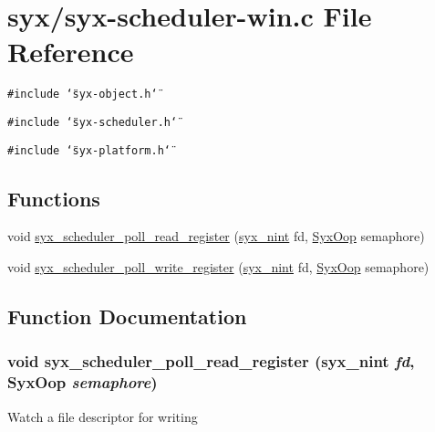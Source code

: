 \hypertarget{syx-scheduler-win_8c}{
\section{syx/syx-scheduler-win.c File Reference}
\label{syx-scheduler-win_8c}
}
{\tt \#include \char`\"{}syx-object.h\char`\"{}}\par
{\tt \#include \char`\"{}syx-scheduler.h\char`\"{}}\par
{\tt \#include \char`\"{}syx-platform.h\char`\"{}}\par
\subsection*{Functions}
\begin{CompactItemize}
\item 
void \hyperlink{syx-scheduler-win_8c_0f6beab52e1173b6a531ba23d437b2bf}{syx\_\-scheduler\_\-poll\_\-read\_\-register} (\hyperlink{syx-types_8h_488ad2504ade19c761a3e2a1726b4781}{syx\_\-nint} fd, \hyperlink{syx-types_8h_1121caba2d40b2ce090b640762744ccd}{SyxOop} semaphore)
\item 
void \hyperlink{syx-scheduler-win_8c_28eac1f77d3be9549426a9166ac5a9f3}{syx\_\-scheduler\_\-poll\_\-write\_\-register} (\hyperlink{syx-types_8h_488ad2504ade19c761a3e2a1726b4781}{syx\_\-nint} fd, \hyperlink{syx-types_8h_1121caba2d40b2ce090b640762744ccd}{SyxOop} semaphore)
\end{CompactItemize}


\subsection{Function Documentation}
\hypertarget{syx-scheduler-win_8c_0f6beab52e1173b6a531ba23d437b2bf}{
\subsubsection{\setlength{\rightskip}{0pt plus 5cm}void syx\_\-scheduler\_\-poll\_\-read\_\-register ({\bf syx\_\-nint} {\em fd}, \/  {\bf SyxOop} {\em semaphore})}}
\label{syx-scheduler-win_8c_0f6beab52e1173b6a531ba23d437b2bf}


Watch a file descriptor for writing

